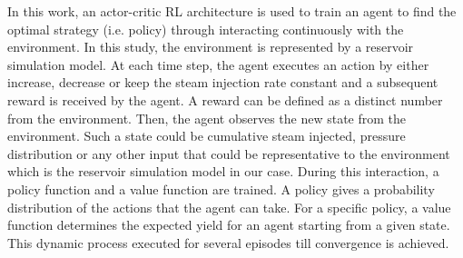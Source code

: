 In this work, an actor-critic RL architecture is used to train an agent to find the optimal strategy (i.e. policy) through interacting continuously with the environment. In this study, the environment is represented by a reservoir simulation model. At each time step, the agent executes an action by either increase, decrease or keep the steam injection rate constant and a subsequent reward is received by the agent. A reward can be defined as a distinct number from the environment. Then, the agent observes the new state from the environment. Such a state could be cumulative steam injected, pressure distribution or any other input that could be representative to the environment which is the reservoir simulation model in our case. During this interaction, a policy function and a value function are trained. A policy gives a probability distribution of the actions that the agent can take. For a specific policy, a value function determines the expected yield for an agent starting from a given state. This dynamic process executed for several episodes till convergence is achieved. 